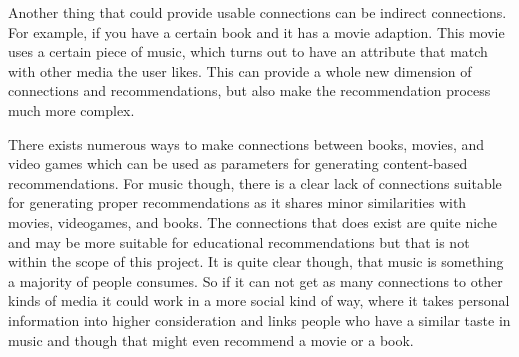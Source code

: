 Another thing that could provide usable connections can be indirect connections. For example, if you have a certain book and it has a movie adaption. This movie uses a certain piece of music, which turns out to have an attribute that match with other media the user likes. This can provide a whole new dimension of connections and recommendations, but also make the recommendation process much more complex.

There exists numerous ways to make connections between books, movies, and video games which can be used as parameters for generating content-based recommendations. For music though, there is a clear lack of connections suitable for generating proper recommendations as it shares minor similarities with movies, videogames, and books. The connections that does exist are quite niche and may be more suitable for educational recommendations but that is not within the scope of this project. It is quite clear though, that music is something a majority of people consumes. So if it can not get as many connections to other kinds of media it could work in a more social kind of way, where it takes personal information into higher consideration and links people who have a similar taste in music and though that might even recommend a movie or a book.